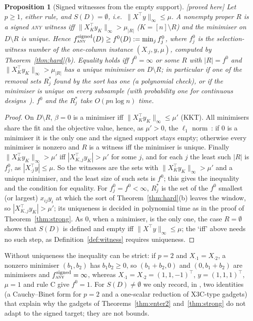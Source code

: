 \documentclass[10pt,a4paper]{article}
\theoremstyle{plain}
\newtheorem{proposition}[theorem]{Proposition}
\theoremstyle{definition}
\theoremstyle{remark}
\newcommand{\status}[1]{\textnormal{\textsf{\small [#1]}}}
\newcommand{\Dm}{D\setminus R}
\newcommand{\tsc}[1]{\textnormal{\textsc{#1}}}  %
\begin{document}
\begin{proposition}[Signed witnesses from the empty support]\label{prop:signed-empty}\status{proved here}
Let $p\ge1$, either rule, and $S(D)=\emptyset$, i.e.\ $\lVert X^{\top}y\rVert_\infty\le\mu$. A nonempty proper $R$ is a signed \tsc{any} witness iff $\lVert X_K^{\top}y_K\rVert_\infty>\mu_{|R|}$ ($K=[n]\setminus R$) and the minimiser on $\Dm$ is unique. Hence $f^{\mathrm{signed}}_{\tsc{any}}(D)\ge f^0(D):=\min_jf^0_j$, where $f^0_j$ is the selection-witness number of the one-column instance $(X_{\cdot j},y,\mu)$, computed by Theorem~\ref{thm:hard}(b). Equality holds iff $f^0=\infty$ or some $R$ with $|R|=f^0$ and $\lVert X_K^{\top}y_K\rVert_\infty>\mu_{|R|}$ has a unique minimiser on $\Dm$; in particular if one of the removal sets $R^\ast_j$ found by the sort has one (a polynomial check), or if the minimiser is unique on every subsample (with probability one for continuous designs~\citep{tibshirani2013}). $f^0$ and the $R^\ast_j$ take $O(pn\log n)$ time.
\end{proposition}
\begin{proof}
On $\Dm$, $\beta=0$ is a minimiser iff $\lVert X_K^{\top}y_K\rVert_\infty\le\mu'$ (KKT). All minimisers share the fit and the objective value, hence, as $\mu'>0$, the $\ell_1$ norm~\citep{tibshirani2013}: if $0$ is a minimiser it is the only one and the signed support stays empty; otherwise every minimiser is nonzero and $R$ is a witness iff the minimiser is unique. Finally $\lVert X_K^{\top}y_K\rVert_\infty>\mu'$ iff $|X_{K,j}^{\top}y_K|>\mu'$ for some $j$, and for each $j$ the least such $|R|$ is $f^0_j$, as $|X_{\cdot j}^{\top}y|\le\mu$. So the witnesses are the sets with $\lVert X_K^{\top}y_K\rVert_\infty>\mu'$ and a unique minimiser, and the least size of such sets is $f^0$; this gives the inequality and the condition for equality. For $f^0_j=f^0<\infty$, $R^\ast_j$ is the set of the $f^0$ smallest (or largest) $x_{ij}y_i$ at which the sort of Theorem~\ref{thm:hard}(b) leaves the window, so $|X_{K,j}^{\top}y_K|>\mu'$; its uniqueness is decided in polynomial time as in the proof of Theorem~\ref{thm:strong}. As $0$, when a minimiser, is the only one, the case $R=\emptyset$ shows that $S(D)$ is defined and empty iff $\lVert X^{\top}y\rVert_\infty\le\mu$; the `iff' above needs no such step, as Definition~\ref{def:witness} requires uniqueness.
\end{proof}
\noindent Without uniqueness the inequality can be strict: if $p=2$ and $X_{\cdot1}=X_{\cdot2}$, a nonzero minimiser $(b_1,b_2)$ has $b_1b_2\ge0$, so $(b_1+b_2,0)$ and $(0,b_1+b_2)$ are minimisers and $f^{\mathrm{signed}}_{\tsc{any}}=\infty$, whereas $X_{\cdot1}=X_{\cdot2}=(1,1,-1)^{\top}$, $y=(1,1,1)^{\top}$, $\mu=1$ and rule C give $f^0=1$.
\noindent For $S(D)\ne\emptyset$ we only record, in , two identities (a Cauchy--Binet form for $p=2$ and a one-scalar reduction of \tsc{X3C}-type gadgets) that explain why the gadgets of Theorems~\ref{thm:enter2} and~\ref{thm:strong} do not adapt to the signed target; they are not bounds.
\end{document}
